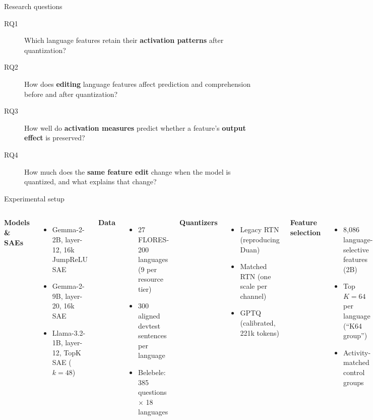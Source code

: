 \documentclass[aspectratio=169,11pt]{beamer}
\begin{document}
\begin{frame}{Research questions}
\begin{description}
\item[\color{blue}RQ1] Which language features retain their \textbf{activation patterns} after quantization?
\item[\color{blue}RQ2] How does \textbf{editing} language features affect prediction and comprehension before and after quantization?
\item[\color{blue}RQ3] How well do \textbf{activation measures} predict whether a feature's \textbf{output effect} is preserved?
\item[\color{blue}RQ4] How much does the \textbf{same feature edit} change when the model is quantized, and what explains that change?
\end{description}
\end{frame}

\begin{frame}{Experimental setup}
\begin{columns}[T]
\textbf{Models \& SAEs}
\begin{itemize}\small
\item Gemma-2-2B, layer-12, 16k JumpReLU SAE
\item Gemma-2-9B, layer-20, 16k SAE
\item Llama-3.2-1B, layer-12, TopK SAE ($k{=}48$)
\end{itemize}
\vspace{4pt}
\textbf{Data}
\begin{itemize}\small
\item 27 FLORES-200 languages (9 per resource tier)
\item 300 aligned devtest sentences per language
\item Belebele: 385 questions $\times$ 18 languages
\end{itemize}

\textbf{Quantizers}
\begin{itemize}\small
\item Legacy RTN (reproducing Duan)
\item Matched RTN (one scale per channel)
\item GPTQ (calibrated, 221k tokens)
\end{itemize}
\vspace{4pt}
\textbf{Feature selection}
\begin{itemize}\small
\item 8,086 language-selective features (2B)
\item Top $K{=}64$ per language (``K64 group'')
\item Activity-matched control groups
\end{itemize}
\end{columns}
\end{frame}
\end{document}
